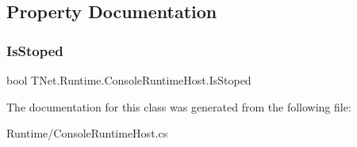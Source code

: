 \subsection{Property Documentation}
\mbox{\label{class_t_net_1_1_runtime_1_1_console_runtime_host_a10e9736669439e4c4d0d7b4f04c6ac0c}} 
\subsubsection{\texorpdfstring{Is\+Stoped}{IsStoped}}
{\footnotesize\ttfamily bool T\+Net.\+Runtime.\+Console\+Runtime\+Host.\+Is\+Stoped\hspace{0.3cm}{\ttfamily [get]}}







The documentation for this class was generated from the following file\+:\begin{DoxyCompactItemize}
\item 
Runtime/Console\+Runtime\+Host.\+cs\end{DoxyCompactItemize}
